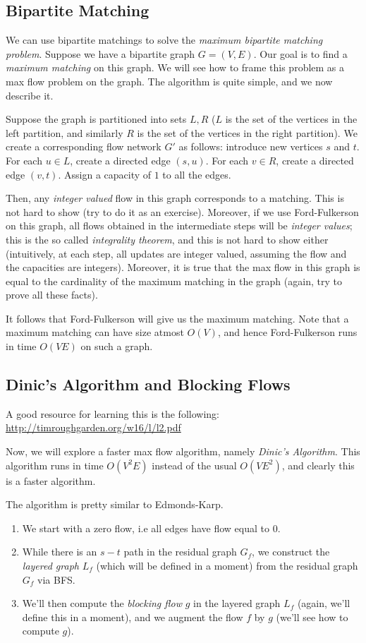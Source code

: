 \documentclass[12pt,a4paper]{amsart}
\numberwithin{equation}{section}
\theoremstyle{definition}
\begin{document}
\subsection{Bipartite Matching} We can use bipartite matchings to solve the \textit{maximum bipartite matching problem}. Suppose we have a bipartite graph $G = (V, E)$. Our goal is to find a \textit{maximum matching} on this graph. We will see how to frame this problem as a max flow problem on the graph. The algorithm is quite simple, and we now describe it.

Suppose the graph is partitioned into sets $L, R$ ($L$ is the set of the vertices in the left partition, and similarly $R$ is the set of the vertices in the right partition). We create a corresponding flow network $G'$ as follows: introduce new vertices $s$ and $t$. For each $u\in L$, create a directed edge $(s, u)$. For each $v\in R$, create a directed edge $(v, t)$. Assign a capacity of $1$ to all the edges. 

Then, any \textit{integer valued} flow in this graph corresponds to a matching. This is not  hard to show (try to do it as an exercise). Moreover, if we use Ford-Fulkerson on this graph, all flows obtained in the intermediate steps will be \textit{integer values}; this is the so called \textit{integrality theorem}, and this is not hard to show either (intuitively, at each step, all updates are integer valued, assuming the flow and the capacities are integers). Moreover, it is true that the max flow in this graph is equal to the cardinality of the maximum matching in the graph (again, try to prove all these facts).

It follows that Ford-Fulkerson will give us the maximum matching. Note that a maximum matching can have size atmost $O(V)$, and hence Ford-Fulkerson runs in time $O(VE)$ on such a graph.  

\subsection{Dinic's Algorithm and Blocking Flows} A good resource for learning this is the following: \url{http://timroughgarden.org/w16/l/l2.pdf} 

Now, we will explore a faster max flow algorithm, namely \textit{Dinic's Algorithm}. This algorithm runs in time $O(V^2E)$ instead of the usual $O(VE^2)$, and clearly this is a faster algorithm.

The algorithm is pretty similar to Edmonds-Karp. 
\begin{enumerate}
	\item We start with a zero flow, i.e all edges have flow equal to $0$.
	\item While there is an $s-t$ path in the residual graph $G_f$, we construct the \textit{layered graph} $L_f$ (which will be defined in a moment) from the residual graph $G_f$ via BFS.
	\item We'll then compute the \textit{blocking flow} $g$ in the layered graph $L_f$ (again, we'll define this in a moment), and we augment the flow $f$ by $g$ (we'll see how to compute $g$).
\end{enumerate}
\end{document}
